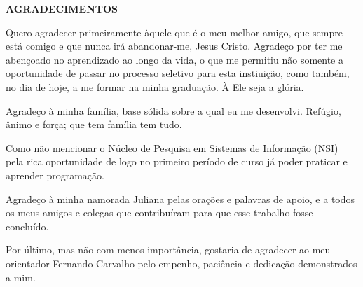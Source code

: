 \begin{center}
\textbf{AGRADECIMENTOS}
\end{center}

Quero agradecer primeiramente àquele que é o meu melhor amigo, que sempre está comigo e que nunca irá abandonar-me, Jesus Cristo. Agradeço por ter me abençoado no aprendizado ao longo da vida, o que me permitiu não somente a oportunidade de passar no processo seletivo para esta instiuição, como também, no dia de hoje, a me formar na minha graduação. À Ele seja a glória.

Agradeço à minha família, base sólida sobre a qual eu me desenvolvi. Refúgio, ânimo e força; que tem família tem tudo.

Como não mencionar o Núcleo de Pesquisa em Sistemas de Informação (NSI) pela rica oportunidade de logo no primeiro período de curso já poder praticar e aprender programação.

Agradeço à minha namorada Juliana pelas orações e palavras de apoio, e a todos os meus amigos e colegas que contribuíram para que esse trabalho fosse concluído. 

Por último, mas não com menos importância, gostaria de agradecer ao meu orientador Fernando Carvalho pelo empenho, paciência e dedicação demonstrados a mim.